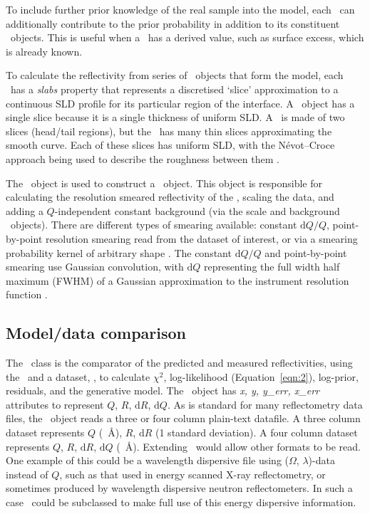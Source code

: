 \documentclass[pdf,preprint]{iucr}
\begin{document}
To include further prior knowledge of the real sample into the model,
each \Component\ can additionally contribute to the prior probability in addition to its constituent \Parameter\ objects. This is useful when a \Component\ has a derived value, such as surface excess, which is already known.

To calculate the reflectivity from series of \Component\ objects that form the model,
each \Component\ has a \emph{slabs} property that represents a discretised `slice' approximation to a continuous SLD profile for its particular region of the interface. A \Slab\ object has a single slice because it is a single thickness of uniform SLD. A \LipidLeaflet\ is made of two slices (head/tail regions), but the \Spline\ has many thin slices approximating the smooth curve. Each of these slices has uniform SLD, with the N\'{e}vot--Croce approach being used to describe the roughness between them \cite{Nevot1980}.

The \Structure\ object is used to construct a \ReflectModel\ object. This object is responsible for calculating the resolution smeared reflectivity of the \Structure, scaling the data, and adding a $Q$-independent constant background (via the scale and background \Parameter\ objects). There are different types of smearing available: constant $\mathrm{d}Q/Q$, point-by-point resolution smearing read from the dataset of interest, or via a smearing probability kernel of arbitrary shape \cite{Nelson2014}. The constant $\mathrm{d}Q/Q$ and point-by-point smearing use Gaussian convolution, with $\mathrm{d}Q$ representing the full width half maximum (FWHM) of a Gaussian approximation to the instrument resolution function \cite{Well2005}.

\subsection{Model/data comparison}
The \Objective\ class is the comparator of the predicted and measured reflectivities, using the \ReflectModel\ and a dataset, \DataD, to calculate $\chi^2$, log-likelihood (Equation~\ref{eqn:2}), log-prior, residuals, and the generative model.
The \DataD\ object has \emph{x, y, y\_err, x\_err} attributes to represent $Q$, $R$, $\mathrm{d}R$, $\mathrm{d}Q$. As is standard for many reflectometry data files, the \DataD\ object reads a three or four column plain-text datafile. A three column dataset represents $Q$ (\si{\per\angstrom}), $R$, $\mathrm{d}R$ (1 standard deviation). A four column dataset represents $Q$, $R$, $\mathrm{d}R$, $\mathrm{d}Q$ (\si{\per\angstrom}). Extending \DataD\ would allow other formats to be read. One example of this could be a wavelength dispersive file using ($\Omega$, $\lambda$)-data instead of $Q$, such as that used in energy scanned X-ray reflectometry, or sometimes produced by wavelength dispersive neutron reflectometers. In such a case \ReflectModel\ could be subclassed to make full use of this energy dispersive information.
\end{document}
